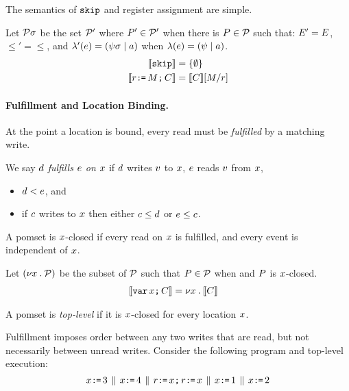 The semantics of $\texttt{skip}$ and register assignment are simple.
\begin{definition}
Let $\mathcal{P}\sigma$ be the set $\mathcal{P}'$ where $P'\in\mathcal{P}'$ when
there is $P\in\mathcal{P}$ such that:
$E' = E$,
${\le'} = {\le}$, 
and
$\lambda'(e) = (\psi\sigma \mid a)$ when $\lambda(e) = (\psi \mid a)$.
\begin{align*}
  \llbracket\texttt{skip}\rrbracket & =
  \{ \emptyset \}
  \\  
  \llbracket r\texttt{:}\mkern-1mu\texttt{=}\,M\texttt{;}\,\allowbreak C\rrbracket & =
  \llbracket C\rrbracket[M/r] 
\end{align*}
\end{definition}

\paragraph{Fulfillment and Location Binding.}
At the point a location is bound, every read must be \emph{fulfilled} by a
matching write.

\begin{definition}
  \label{def:rf}
  We say $d$ \emph{fulfills $e$ on $x$} if $d$ \externally writes
  $v$ to $x$, $e$ \externally reads $v$ from $x$,
  \begin{itemize}
  \item
    $d < e$, and
  \item
    if $c$ \externally writes to $x$ then either $c \leq d$ or $e \leq c$.
  \end{itemize}

  A pomset is $x$-closed if every \external read on $x$ is fulfilled,
  and every event is independent of $x$.

  Let $(\nu x\mathbin.\mathcal{P})$ be the subset of $\mathcal{P}$ such that $P\in\mathcal{P}$
  when and $P$ is $x$-closed.
\begin{align*}
  \llbracket\texttt{var}\,x\texttt{;}\,\allowbreak C\rrbracket & =
  \nu x \mathbin. \llbracket C\rrbracket  
\end{align*}

  A pomset is \emph{top-level} if it is $x$-closed for every location $x$.
\end{definition}

Fulfillment imposes order between any two writes that are read, but not
necessarily between unread writes.  Consider the following program and
top-level execution:
\begin{displaymath}
  x\texttt{:}\mkern-1mu\texttt{=}\, 3
  \,\mathbin{\|}\,
  x\texttt{:}\mkern-1mu\texttt{=}\, 4
  \,\mathbin{\|}\,
  r\texttt{:}\mkern-1mu\texttt{=}\, x\texttt{;}\,\allowbreak r\texttt{:}\mkern-1mu\texttt{=}\, x 
  \,\mathbin{\|}\,
  x\texttt{:}\mkern-1mu\texttt{=}\, 1
  \,\mathbin{\|}\,
  x\texttt{:}\mkern-1mu\texttt{=}\,2
\end{displaymath}
\begin{tikzdisplay}[node distance=1em]
\end{tikzdisplay}

